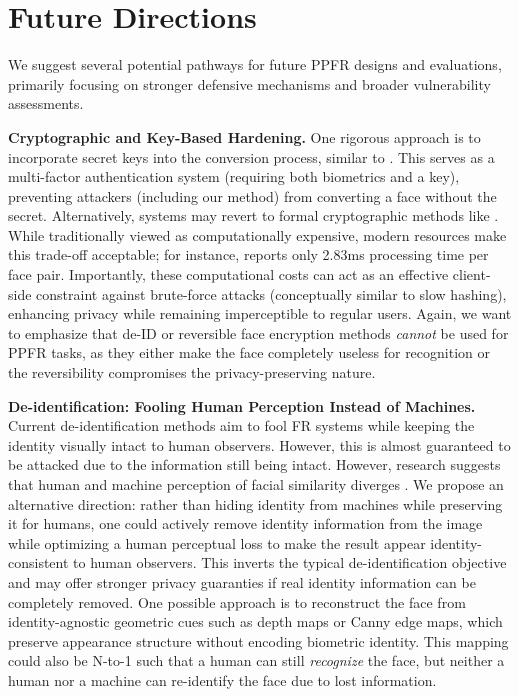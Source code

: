 \section{Future Directions}
\label{sec:fur}
We suggest several potential pathways for future PPFR designs and evaluations, primarily focusing on stronger defensive mechanisms and broader vulnerability assessments.

\textbf{Cryptographic and Key-Based Hardening.} 
One rigorous approach is to incorporate secret keys into the conversion process, similar to \citet{yuan_generating_2022}. This serves as a multi-factor authentication system (requiring both biometrics and a key), preventing attackers (including our method) from converting a face without the secret. Alternatively, systems may revert to formal cryptographic methods like \cite{ao_cryptoface_2025}. While traditionally viewed as computationally expensive, modern resources make this trade-off acceptable; for instance, \citet{jindal_secure_2020} reports only 2.83ms processing time per face pair. Importantly, these computational costs can act as an effective client-side constraint against brute-force attacks (conceptually similar to slow hashing), enhancing privacy while remaining imperceptible to regular users. Again, we want to emphasize that de-ID or reversible face encryption methods \textit{cannot} be used for PPFR tasks, as they either make the face completely useless for recognition or the reversibility compromises the privacy-preserving nature.


\textbf{De-identification: Fooling Human Perception Instead of Machines.} Current de-identification methods aim to fool FR systems while keeping the identity visually intact to human observers. However, this is almost guaranteed to be attacked due to the information still being intact. However, research suggests that human and machine perception of facial similarity diverges \cite{sadovnik_finding_2018}. We propose an alternative direction: rather than hiding identity from machines while preserving it for humans, one could actively remove identity information from the image while optimizing a human perceptual loss to make the result appear identity-consistent to human observers. This inverts the typical de-identification objective and may offer stronger privacy guaranties if real identity information can be completely removed. One possible approach is to reconstruct the face from identity-agnostic geometric cues such as depth maps or Canny edge maps, which preserve appearance structure without encoding biometric identity. This mapping could also be N-to-1 such that a human can still \textit{recognize} the face, but neither a human nor a machine can re-identify the face due to lost information.






